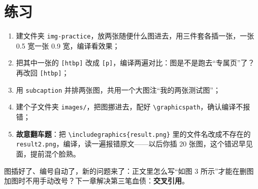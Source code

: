 \section*{练习}

\begin{enumerate}
\setlength{\itemsep}{2pt}
\item 建文件夹 \texttt{img-practice}，放两张随便什么图进去，用三件套各插一张，一张 0.5 宽一张 0.9 宽，编译看效果；
\item 把其中一张的 \texttt{[htbp]} 改成 \texttt{[p]}，编译两遍对比：图是不是跑去“专属页”了？再改回 \texttt{[htbp]}；
\item 用 \texttt{subcaption} 并排两张图，共用一个大图注“我的两张测试图”；
\item 建个子文件夹 \texttt{images/}，把图挪进去，配好 \texttt{\textbackslash{}graphicspath}，确认编译不报错；
\item \textbf{故意翻车题}：把 \texttt{\textbackslash{}includegraphics\{result.png\}} 里的文件名改成不存在的 \texttt{result2.png}，编译，读一遍报错原文——以后你插 20 张图，这个错迟早见面，提前混个脸熟。
\end{enumerate}

图插好了、编号自动了，新的问题来了：正文里怎么写“如图 3 所示”才能在删图加图时不用手动改号？下一章解决第三笔血债：\textbf{交叉引用}。
